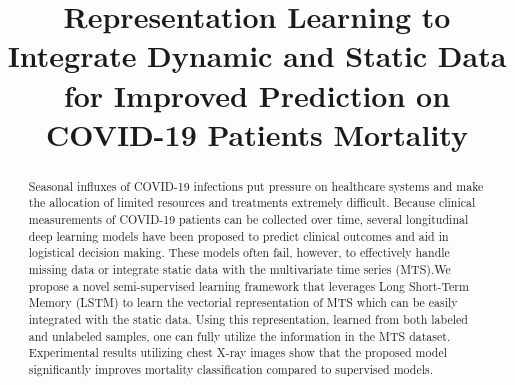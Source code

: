 \documentclass[10pt,twocolumn,letterpaper]{article}
\begin{document}
\title{Representation Learning to Integrate Dynamic and Static Data for Improved Prediction on COVID-19 Patients Mortality}

\author{}

\maketitle
\ificcvfinal\thispagestyle{empty}\fi

\begin{abstract}
   Seasonal influxes of COVID-19 infections put pressure on healthcare systems and make the allocation of limited resources and treatments extremely difficult. Because clinical measurements of COVID-19 patients can be collected over time, several longitudinal deep learning models have been proposed to predict clinical outcomes and aid in logistical decision making. These models often fail, however, to effectively handle missing data or integrate static data with the multivariate time series (MTS).We propose a novel semi-supervised learning framework that leverages Long Short-Term Memory (LSTM) to learn the vectorial representation of MTS which can be easily integrated with the static data. Using this representation, learned from both labeled and unlabeled samples, one can fully utilize the information in the MTS dataset. Experimental results utilizing chest X-ray images show that the proposed model significantly improves mortality classification compared to supervised models.
\end{abstract}






{\small


}
\end{document}
